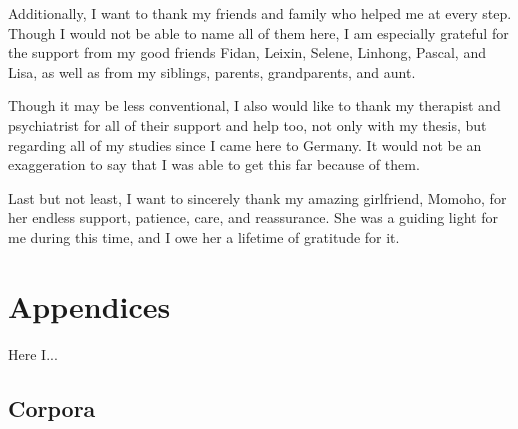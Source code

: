 \documentclass[12pt,a4paper]{article}
\numberwithin{figure}{section}
\numberwithin{table}{section}
\numberwithin{definition}{section}
\begin{document}
Additionally, I want to thank my friends and family who helped me at every step. Though I would not be able to name all of them here, I am especially grateful for the support from my good friends Fidan, Leixin, Selene, Linhong, Pascal, and Lisa, as well as from my siblings, parents, grandparents, and aunt. 

Though it may be less conventional, I also would like to thank my therapist and psychiatrist for all of their support and help too, not only with my thesis, but regarding all of my studies since I came here to Germany. It would not be an exaggeration to say that I was able to get this far because of them.

Last but not least, I want to sincerely thank my amazing girlfriend, Momoho, for her endless support, patience, care, and reassurance. She was a guiding light for me during this time, and I owe her a lifetime of gratitude for it.

\newpage
\begingroup
\sloppy
\printbibliography
\endgroup

\newpage
\section{Appendices}
\label{sec:appendices}

Here I...

\subsection{Corpora}
\label{ssec:corporaapp}

\end{document}
